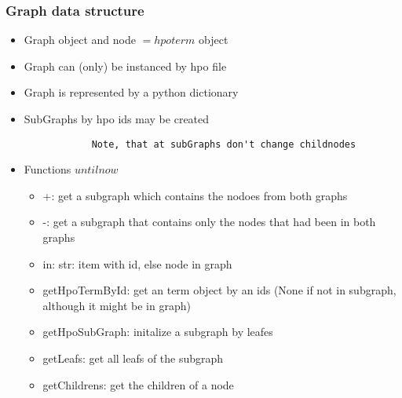 \documentclass{beamer}
\begin{document}
\begin{frame}[fragile]
 \frametitle{Graph data structure}

\begin{itemize}
	\item Graph object and node \(= hpo term\) object
	\item Graph can (only) be instanced by hpo file
	\item Graph is represented by a python dictionary
	\item SubGraphs by hpo ids may be created
		\begin{verbatim}
			Note, that at subGraphs don't change childnodes
		\end{verbatim}
	\item Functions \(until now\)
		\begin{itemize}
			\item +: get a subgraph which contains the nodoes from both graphs
			\item -: get a subgraph that contains only the nodes that had been in both graphs
			\item in: str: item with id, else node in graph
			\item getHpoTermById: get an term object by an ids (None if not in subgraph, although it might be in graph)
			\item getHpoSubGraph: initalize a subgraph by leafes
			\item getLeafs: get all leafs of the subgraph
			\item getChildrens: get the children of a node
		\end{itemize}
\end{itemize}

\end{frame}
\end{document}
